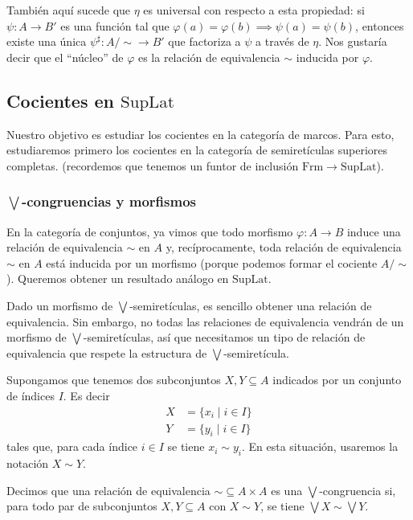 \documentclass[12pt,letterpaper,titlepage]{article}
\theoremstyle{definition}
\newcommand\Sup{\bigvee}
\renewcommand\phi{\varphi}
\newcommand\simr{{\sim}}
\newcommand\tps[2]{\texorpdfstring{#1}{#2}}
\newcommand\<{\langle}
\renewcommand\>{\rangle}
\newcommand{\Frm}{\mathrm{Frm}}
\newcommand{\SupLat}{\mathrm{SupLat}}
\begin{document}
También aquí sucede que $\eta$ es universal con respecto a esta
propiedad: si $\psi:A\to B'$ es una función tal que
$\phi(a)=\phi(b)\implies \psi(a)=\psi(b)$,
entonces existe una única $\psi^\sharp:A/\simr\to B'$
que factoriza a $\psi$ a través de $\eta$.
Nos gustaría decir que el ``núcleo'' de $\phi$ es la relación de
equivalencia $\sim$ inducida por $\phi$.

\subsection{Cocientes en \tps{$\SupLat$}{SupLat}}
Nuestro objetivo es estudiar los cocientes
en la categoría de marcos.
Para esto, estudiaremos primero los cocientes en la categoría
de semiretículas superiores completas.
(recordemos que tenemos un funtor de inclusión $\Frm\to\SupLat$).

\subsubsection{\tps{$\Sup$}{Sup}-congruencias y morfismos}

En la categoría de conjuntos, ya vimos que todo morfismo $\phi:A\to B$
induce una relación de equivalencia $\simr$ en $A$  y, recíprocamente,
toda relación de equivalencia $\simr$ en $A$ está inducida por
un morfismo (porque podemos formar el cociente $A/\simr$).
Queremos obtener un resultado análogo en $\SupLat$.

Dado un morfismo de $\Sup$-semiretículas,
es sencillo obtener una relación de equivalencia.
Sin embargo, no todas las relaciones de equivalencia vendrán
de un morfismo de $\Sup$-semiretículas,
así que necesitamos un tipo de relación de equivalencia
que respete la estructura de $\Sup$-semiretícula.

Supongamos que tenemos dos subconjuntos $X,Y\subseteq A$ indicados por un
conjunto de índices $I$.
Es decir
\begin{align*}
    X &= \{x_i \mid i\in I\} \\
    Y &= \{y_i \mid i\in I\}
\end{align*}
tales que, para cada índice $i\in I$ se tiene $x_i\sim y_i$.
En esta situación, usaremos la notación $X\sim Y$.

Decimos que una relación de equivalencia $\simr\subseteq A\times A$ es una
$\Sup$-congruencia si, para todo par de subconjuntos $X,Y\subseteq A$ con
$X\sim Y$, se tiene $\Sup X\sim \Sup Y$.
\end{document}

